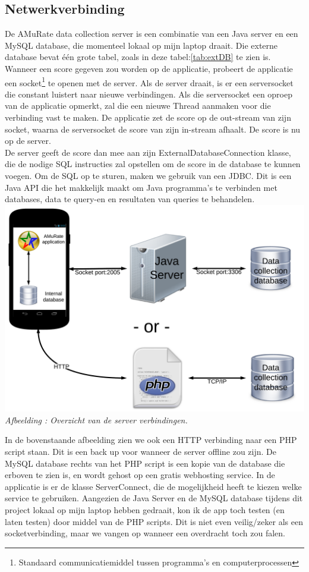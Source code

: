 \documentclass[11pt,a4paper]{article}
\newcounter{figc}
\newcommand{\increaseFigID} {%
   \stepcounter{figc}%
   \thefigc}
\newcommand{\figID}[1]{\small \textit{Afbeelding \increaseFigID : #1} \\ \normalsize}
\begin{document}
	\subsection{Netwerkverbinding}
	\label{sec:Netwerkverbinding}
	De AMuRate data collection server is een combinatie van een Java server en een MySQL database, die momenteel lokaal op mijn laptop draait. Die externe database bevat één grote tabel, zoals in deze tabel:\ref{tab:extDB} te zien is. Wanneer een score gegeven zou worden op de applicatie, probeert de applicatie een socket\footnote{Standaard communicatiemiddel tussen programma's en computerprocessen} te openen met de server. Als de server draait, is er een serversocket die constant luistert naar nieuwe verbindingen. Als die serversocket een oproep van de applicatie opmerkt, zal die een nieuwe Thread aanmaken voor die verbinding vast te maken. De applicatie zet de score op de out-stream van zijn socket, waarna de serversocket de score van zijn in-stream afhaalt. De score is nu op de server. \\
De server geeft de score dan mee aan zijn ExternalDatabaseConnection klasse, die de nodige SQL instructies zal opstellen om de score in de database te kunnen voegen. Om de SQL op te sturen, maken we gebruik van een JDBC. Dit is een Java API die het makkelijk maakt om Java programma's te verbinden met databases, data te query-en en resultaten van queries te behandelen. \\

	\includegraphics[scale=0.12]{Pictures/Sockets_w_php.png} \newline
	\figID{Overzicht van de server verbindingen.}

	In de bovenstaande afbeelding zien we ook een HTTP verbinding naar een PHP script staan. Dit is een back up voor wanneer de server offline zou zijn. De MySQL database rechts van het PHP script is een kopie van de database die erboven te zien is, en wordt gehost op een gratis webhosting service. In de applicatie is er de klasse ServerConnect, die de mogelijkheid heeft te kiezen welke service te gebruiken. Aangezien de Java Server en de MySQL database tijdens dit project lokaal op mijn laptop hebben gedraait, kon ik de app toch testen (en laten testen) door middel van de PHP scripts. Dit is niet even veilig/zeker als een socketverbinding, maar we vangen op wanneer een overdracht toch zou falen.
\end{document}
